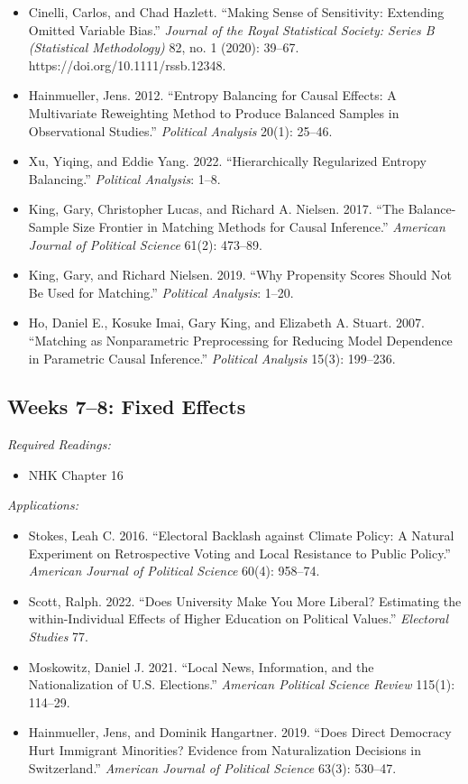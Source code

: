 \documentclass[11pt, letterpaper]{article}
\begin{document}
\begin{itemize}
	\item Cinelli, Carlos, and Chad Hazlett. ``Making Sense of Sensitivity: Extending Omitted Variable Bias.'' \textit{Journal of the Royal Statistical Society: Series B (Statistical Methodology)} 82, no. 1 (2020): 39–67. https://doi.org/10.1111/rssb.12348.
	\item Hainmueller, Jens. 2012. ``Entropy Balancing for Causal Effects: A Multivariate Reweighting Method to Produce Balanced Samples in Observational Studies.'' \textit{Political Analysis} 20(1): 25–46.
	\item Xu, Yiqing, and Eddie Yang. 2022. ``Hierarchically Regularized Entropy Balancing.'' \textit{Political Analysis}: 1–8.
	\item King, Gary, Christopher Lucas, and Richard A. Nielsen. 2017. ``The Balance-Sample Size Frontier in Matching Methods for Causal Inference.'' \textit{American Journal of Political Science} 61(2): 473–89.
	\item King, Gary, and Richard Nielsen. 2019. ``Why Propensity Scores Should Not Be Used for Matching.'' \textit{Political Analysis}: 1–20.
	\item Ho, Daniel E., Kosuke Imai, Gary King, and Elizabeth A. Stuart. 2007. “Matching as Nonparametric Preprocessing for Reducing Model Dependence in Parametric Causal Inference.” \textit{Political Analysis} 15(3): 199–236.
\end{itemize}

\subsection*{Weeks 7--8: Fixed Effects}

\textit{Required Readings:}

\begin{itemize}
	\item NHK Chapter 16
\end{itemize}

\noindent \textit{Applications:}

\begin{itemize}
	\item Stokes, Leah C. 2016. ``Electoral Backlash against Climate Policy: A Natural Experiment on Retrospective Voting and Local Resistance to Public Policy.'' \textit{American Journal of Political Science} 60(4): 958–74.
	\item Scott, Ralph. 2022. “Does University Make You More Liberal? Estimating the within-Individual Effects of Higher Education on Political Values.” \textit{Electoral Studies} 77.
	\item Moskowitz, Daniel J. 2021. “Local News, Information, and the Nationalization of U.S. Elections.” \textit{American Political Science Review} 115(1): 114–29.
	\item Hainmueller, Jens, and Dominik Hangartner. 2019. “Does Direct Democracy Hurt Immigrant Minorities? Evidence from Naturalization Decisions in Switzerland.” \textit{American Journal of Political Science} 63(3): 530–47.
\end{itemize}
\end{document}
